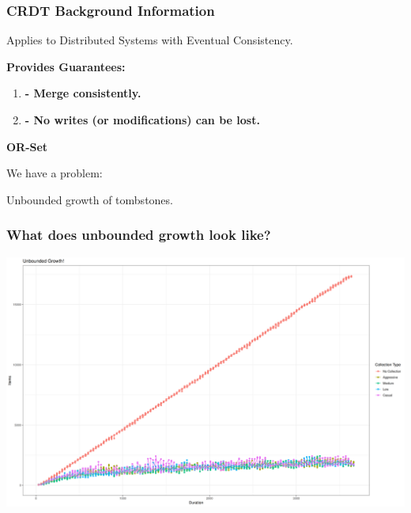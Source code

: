 \documentclass{beamer}
\begin{document}
    \begin{frame}[shrink]
        \frametitle{CRDT Background Information}

        Applies to Distributed Systems with Eventual Consistency.

        \textbf{Provides Guarantees:}

        \begin{enumerate}
            \item \textbf{- Merge consistently.}
            \item \textbf{- No writes (or modifications) can be lost.}
        \end{enumerate}

        \textbf{OR-Set}

    \end{frame}


    \begin{frame}
        \begin{center}
            \large{We have a problem:}
            \pause

            \large{Unbounded growth of tombstones.}
        \end{center}
    \end{frame}


    \begin{frame}[shrink]
        \frametitle{What does unbounded growth look like?}
        \includegraphics[width=\textwidth]{Unbounded}
    \end{frame}
\end{document}
